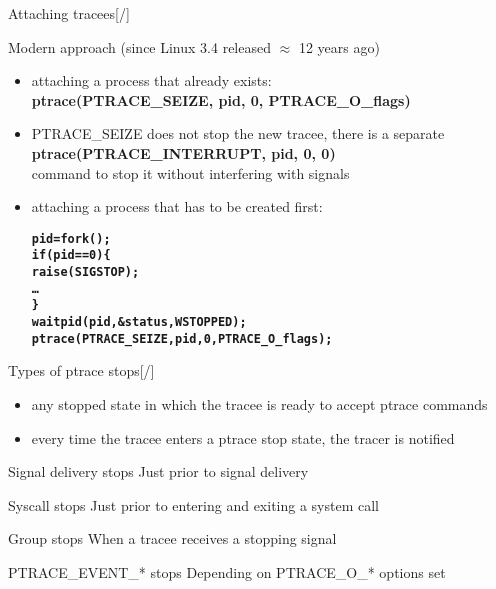 \documentclass[unicode,aspectratio=169,xcolor={table,dvipsnames,usernames}]{beamer}
\begin{document}
\begin{frame}[fragile]{\Large Attaching tracees\hfill [\insertframenumber/\inserttotalframenumber]}
\large
\begin{block}{Modern approach (since Linux 3.4 released $\approx$ 12 years ago)}
\begin{itemize}
	\item attaching a process that already exists: \\
		\textbf{ptrace(PTRACE\_SEIZE, pid, 0, PTRACE\_O\_flags)}
	\item PTRACE\_SEIZE does not stop the new tracee, there is a separate \\
		\textbf{ptrace(PTRACE\_INTERRUPT, pid, 0, 0)} \\
		command to stop it without interfering with signals
	\item attaching a process that has to be created first:
	\begin{alltt}\bf
		pid = fork();
		if (pid == 0) \{
		    raise(SIGSTOP);
		    \ldots
		\}
		waitpid(pid, &status, WSTOPPED);
		ptrace(PTRACE_SEIZE, pid, 0, PTRACE_O_flags);
	\end{alltt}
\end{itemize}
\end{block}
\end{frame}

\begin{frame}{\Large Types of ptrace stops\hfill [\insertframenumber/\inserttotalframenumber]}
\begin{itemize}
	\item any stopped state in which the tracee is ready to accept ptrace commands
	\item every time the tracee enters a ptrace stop state, the tracer is notified
\end{itemize}
\Large
\begin{block}{Signal delivery stops}
	Just prior to signal delivery
\end{block}
\begin{block}{Syscall stops}
	Just prior to entering and exiting a system call
\end{block}
\begin{block}{Group stops}
	When a tracee receives a stopping signal
\end{block}
\begin{block}{PTRACE\_EVENT\_* stops}
	Depending on PTRACE\_O\_* options set
\end{block}
\end{frame}
\end{document}
